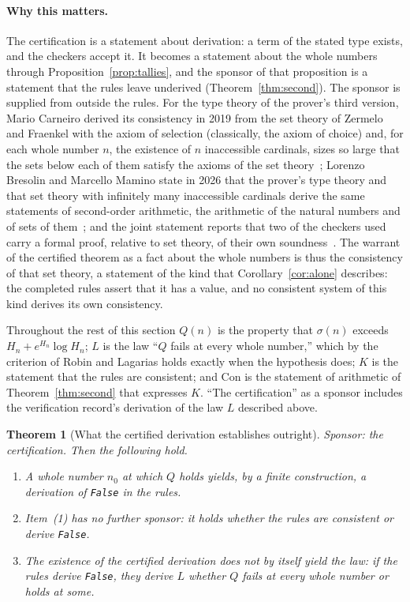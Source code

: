 \documentclass[11pt]{article}
\newtheorem{theorem}{Theorem}[section]
\theoremstyle{definition}
\theoremstyle{remark}
\DeclareRobustCommand{\lean}[1]{{\renewcommand{\_}{\textunderscore\allowbreak}\texttt{#1}}}
\newcommand{\False}{\lean{False}}
\begin{document}
\paragraph{Why this matters.} The certification is a statement about derivation: a term of the stated type exists, and the checkers accept it. It becomes a statement about the whole numbers through Proposition~\ref{prop:tallies}, and the sponsor of that proposition is a statement that the rules leave underived (Theorem~\ref{thm:second}). The sponsor is supplied from outside the rules. For the type theory of the prover's third version, Mario Carneiro derived its consistency in 2019 from the set theory of Zermelo and Fraenkel with the axiom of selection (classically, the axiom of choice) and, for each whole number $n$, the existence of $n$ inaccessible cardinals, sizes so large that the sets below each of them satisfy the axioms of the set theory~\citep{carneiro}; Lorenzo Bresolin and Marcello Mamino state in 2026 that the prover's type theory and that set theory with infinitely many inaccessible cardinals derive the same statements of second-order arithmetic, the arithmetic of the natural numbers and of sets of them~\citep{bresolinmamino}; and the joint statement reports that two of the checkers used carry a formal proof, relative to set theory, of their own soundness~\citep{leanblog}. The warrant of the certified theorem as a fact about the whole numbers is thus the consistency of that set theory, a statement of the kind that Corollary~\ref{cor:alone} describes: the completed rules assert that it has a value, and no consistent system of this kind derives its own consistency.

Throughout the rest of this section $Q(n)$ is the property that $\sigma(n)$ exceeds $H_n+e^{H_n}\log H_n$; $L$ is the law ``$Q$ fails at every whole number,'' which by the criterion of Robin and Lagarias holds exactly when the hypothesis does; $K$ is the statement that the rules are consistent; and $\mathrm{Con}$ is the statement of arithmetic of Theorem~\ref{thm:second} that expresses $K$. ``The certification'' as a sponsor includes the verification record's derivation of the law $L$ described above.

\begin{theorem}[What the certified derivation establishes outright]\label{thm:outright}
Sponsor: the certification. Then the following hold.
\begin{enumerate}[leftmargin=2em,itemsep=1pt]
\item A whole number $n_0$ at which $Q$ holds yields, by a finite construction, a derivation of \False{} in the rules.
\item Item~(1) has no further sponsor: it holds whether the rules are consistent or derive \False.
\item The existence of the certified derivation does not by itself yield the law: if the rules derive \False, they derive $L$ whether $Q$ fails at every whole number or holds at some.
\end{enumerate}
\end{theorem}
\end{document}
